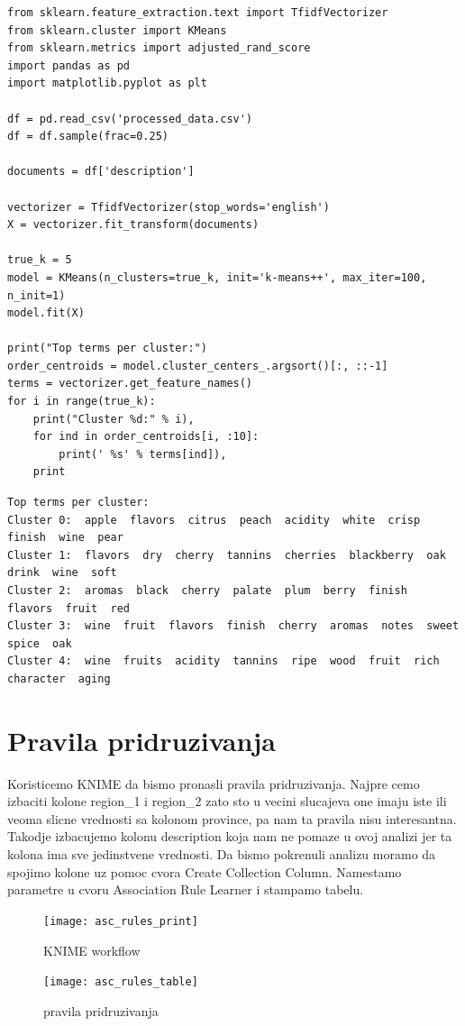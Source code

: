 \documentclass[11pt]{article} %
\begin{document}
\begin{lstlisting}
from sklearn.feature_extraction.text import TfidfVectorizer
from sklearn.cluster import KMeans
from sklearn.metrics import adjusted_rand_score
import pandas as pd
import matplotlib.pyplot as plt 

df = pd.read_csv('processed_data.csv')
df = df.sample(frac=0.25)

documents = df['description']

vectorizer = TfidfVectorizer(stop_words='english')
X = vectorizer.fit_transform(documents)

true_k = 5
model = KMeans(n_clusters=true_k, init='k-means++', max_iter=100, n_init=1)
model.fit(X)

print("Top terms per cluster:")
order_centroids = model.cluster_centers_.argsort()[:, ::-1]
terms = vectorizer.get_feature_names()
for i in range(true_k):
    print("Cluster %d:" % i),
    for ind in order_centroids[i, :10]:
        print(' %s' % terms[ind]),
    print
\end{lstlisting}

\begin {lstlisting}
Top terms per cluster:
Cluster 0:  apple  flavors  citrus  peach  acidity  white  crisp  finish  wine  pear
Cluster 1:  flavors  dry  cherry  tannins  cherries  blackberry  oak  drink  wine  soft
Cluster 2:  aromas  black  cherry  palate  plum  berry  finish  flavors  fruit  red
Cluster 3:  wine  fruit  flavors  finish  cherry  aromas  notes  sweet  spice  oak
Cluster 4:  wine  fruits  acidity  tannins  ripe  wood  fruit  rich  character  aging
\end{lstlisting}
\newpage
\section{Pravila pridruzivanja}
Koristicemo KNIME da bismo pronasli pravila pridruzivanja. Najpre cemo izbaciti kolone region\_1 i 
region\_2 zato sto u vecini slucajeva one imaju iste ili veoma slicne vrednosti sa kolonom province, pa 
nam ta pravila nisu interesantna. Takodje izbacujemo kolonu description koja nam ne pomaze u ovoj analizi jer ta 
kolona ima sve jedinstvene vrednosti. Da bismo pokrenuli analizu moramo da spojimo kolone uz pomoc cvora 
Create Collection Column. Namestamo parametre u cvoru Association Rule Learner i stampamo tabelu.
\begin{figure}[h!]
	\centering
		\texttt{[image: asc\_rules\_print]}
		\caption{KNIME workflow}
	\end{figure}
\begin{figure}[h!]
	\centering
		\texttt{[image: asc\_rules\_table]}
		\caption{pravila pridruzivanja}
	\end{figure}
\end{document}

